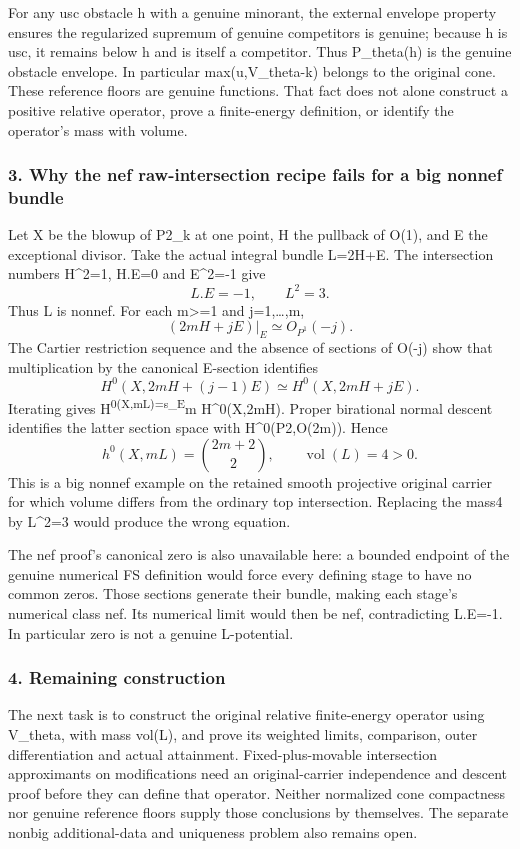 \documentclass[
  10pt,
]{article}
\begin{document}
For any usc obstacle h with a genuine minorant, the external envelope
property ensures the regularized supremum of genuine competitors is
genuine; because h is usc, it remains below h and is itself a
competitor. Thus P\_theta(h) is the genuine obstacle envelope. In
particular max(u,V\_theta-k) belongs to the original cone. These
reference floors are genuine functions. That fact does not alone
construct a positive relative operator, prove a finite-energy
definition, or identify the operator's mass with volume.

\subsubsection{3. Why the nef raw-intersection recipe fails for a big
nonnef
bundle}\label{why-the-nef-raw-intersection-recipe-fails-for-a-big-nonnef-bundle}

Let X be the blowup of P2\_k at one point, H the pullback of O(1), and E
the exceptional divisor. Take the actual integral bundle L=2H+E. The
intersection numbers H\^{}2=1, H.E=0 and E\^{}2=-1 give \[
 L.E=-1,\qquad L^2=3.
\] Thus L is nonnef. For each m\textgreater=1 and j=1,\ldots,m, \[
 (2mH+jE)|_E\simeq O_{P^1}(-j).
\] The Cartier restriction sequence and the absence of sections of O(-j)
show that multiplication by the canonical E-section identifies \[
 H^0(X,2mH+(j-1)E)\simeq H^0(X,2mH+jE).
\] Iterating gives H\textsuperscript{0(X,mL)=s\_E}m H\^{}0(X,2mH).
Proper birational normal descent identifies the latter section space
with H\^{}0(P2,O(2m)). Hence \[
 h^0(X,mL)=\binom{2m+2}{2},\qquad \operatorname{vol}(L)=4>0.
\] This is a big nonnef example on the retained smooth projective
original carrier for which volume differs from the ordinary top
intersection. Replacing the mass4 by L\^{}2=3 would produce the wrong
equation.

The nef proof's canonical zero is also unavailable here: a bounded
endpoint of the genuine numerical FS definition would force every
defining stage to have no common zeros. Those sections generate their
bundle, making each stage's numerical class nef. Its numerical limit
would then be nef, contradicting L.E=-1. In particular zero is not a
genuine L-potential.

\subsubsection{4. Remaining construction}\label{remaining-construction}

The next task is to construct the original relative finite-energy
operator using V\_theta, with mass vol(L), and prove its weighted
limits, comparison, outer differentiation and actual attainment.
Fixed-plus-movable intersection approximants on modifications need an
original-carrier independence and descent proof before they can define
that operator. Neither normalized cone compactness nor genuine reference
floors supply those conclusions by themselves. The separate nonbig
additional-data and uniqueness problem also remains open.
\end{document}
